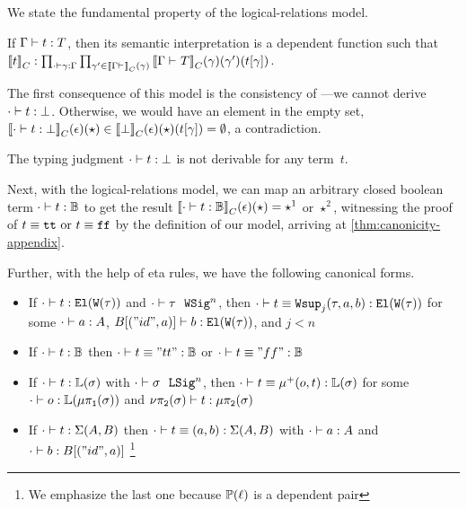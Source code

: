 We state the fundamental property of the logical-relations model.
\begin{theorem}
  If\/ $ {\Gamma} \vdash {t} : {T} $, then its semantic interpretation is a dependent function such that
  ${\llbracket {t} \rrbracket}_C : \prod_{ {\cdot} \vdash {\ensuremath{\gamma}} : {\Gamma} } \prod_{\gamma' \in {\llbracket {\ensuremath{ {\Gamma} \vdash_{} }} \rrbracket}_C(\gamma)}{\llbracket {\ensuremath{ {\Gamma} \vdash_{} {T} }} \rrbracket}_C(\gamma)(\gamma')({t}\!\left[{\gamma}\right])$.
\end{theorem}

The first consequence of this model is the consistency of \TT---we cannot derive
$ {\cdot} \vdash {t} : {\bot} $. Otherwise, we would have an element in the empty set,
${\llbracket {\ensuremath{ {\cdot} \vdash {t} : {\bot} }} \rrbracket}_C(\epsilon)(\star) \in
{\llbracket {\bot} \rrbracket}_C(\epsilon)(\star)({t}\!\left[{\gamma}\right]) = \emptyset$, a contradiction.

\begin{theorem}[Consistency]
  The typing judgment $ {\cdot} \vdash {t} : {\bot} $ is not derivable for any term~$t$.
\end{theorem}

Next, with the logical-relations model, we can map an arbitrary closed boolean
term $ {\cdot} \vdash {t} : {\mathbb{B}} $ to get the result
${\llbracket {\ensuremath{ {\cdot} \vdash {t} : {\mathbb{B}} }} \rrbracket}_C(\epsilon)(\star) = \star^1$ or $\star^2$,
witnessing the proof of $t \equiv \texttt{tt} \text{ or } t \equiv\texttt{ff}$ by the definition of our model, arriving at
\cref{thm:canonicity-appendix}.


Further, with the help of eta rules, we have the following canonical forms.
\begin{theorem}\hfill
  \begin{itemize}
    \item If $ {\cdot} \vdash {t} : {\texttt{El}({\texttt{W}({\tau})})} $ and $ {\cdot} \vdash {\tau} \ \ \texttt{WSig}^{n} $, then $ {\cdot} \vdash {t \equiv \ensuremath{\texttt{Wsup}_{j}({\tau},{a},{b})}} : {\texttt{El}({\texttt{W}({\tau})})} $ for some $ {\cdot} \vdash {a} : {A} $, $ {B[("id", a)]} \vdash {b} : {\texttt{El}({\texttt{W}({\tau})})} $, and $j < n$
    \item If $ {\cdot} \vdash {t} : {\mathbb{B}} $ then $ {\cdot} \vdash {t \equiv "tt"} : {\mathbb{B}} $ or $ {\cdot} \vdash {t \equiv "ff"} : {\mathbb{B}} $ 
    \item If $ {\cdot} \vdash {t} : {\mathbb{L}({\sigma})} $ with $ {\cdot} \vdash {\sigma} \ \ \texttt{LSig}^{n} $, then $ {\cdot} \vdash {t \equiv \ensuremath{\mu^+({o},{t})}} : {\mathbb{L}({\sigma})} $ 
      for some $ {\cdot} \vdash {o} : {\mathbb{L}({\mu\pi_{\texttt{1}}({\sigma})})} $ and $ {\nu\pi_{\texttt{2}}({\sigma})} \vdash {t} : {\mu\pi_{\texttt{2}}({\sigma})} $
    \item If $ {\cdot} \vdash {t} : {\Sigma({A},{B})} $ then $ {\cdot} \vdash {t \equiv (a, b)} : {\Sigma({A},{B})} $ with $ {\cdot} \vdash {a} : {A} $ and $ {\cdot} \vdash {b} : {B[("id", a)]} $
    \footnote{We emphasize the last one because $\mathbb{P}({\ell})$ is a dependent pair}
  \end{itemize}
\end{theorem}


